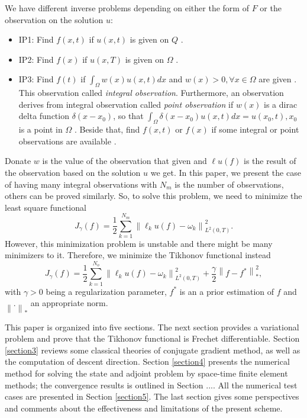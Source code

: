 \documentclass[]{article}
\begin{document}
We have different inverse problems depending on either the form of $F$ or the observation on the solution $u$: 
\begin{itemize}
	\item IP1: Find $f(x, t)$ if $u(x, t)$ is given on $Q$ \cite{a1, a2}.
	\item IP2: Find $f(x)$ if $u(x, T)$ is given on $\Omega$ \cite{a3, a4, a5, a6}.
	\item IP3: Find $f(t)$ if $\int_\Omega w(x)u(x, t)dx$ and $w(x)>0, \forall x\in \Omega$ are given \cite{a7, a8, a9}. This observation called \textit{integral observation}. Furthermore, an observation derives from integral observation called \textit{point observation} if $w(x)$ is a dirac delta function $\delta(x-x_0)$, so that $\int_\Omega\delta(x-x_0)u(x, t)dx=u(x_0, t), x_0$ is a point in $\Omega$ \cite{a10, a11, a12}. Beside that, find $f(x, t)$ or $f(x)$ if some integral or point observations are available \cite{a13}.
\end{itemize}
Donate $w$ is the value of the observation that given and $\ell u(f)$ is the result of the observation based on the solution $u$ we get. In this paper, we present  the case of having many integral observations with $N_m$ is the number of observations, others can be proved similarly. So, to solve this problem, we need to minimize the least square functional \cite{a14, a15}
$$J_{\gamma}(f)=\frac{1}{2}\sum_{k=1}^{N_{m}}\left\|\ell_k u(f)-\omega_k\right\|_{L^2(0, T)}^2.$$
However, this minimization problem is unstable and there might be many minimizers to it. Therefore, we minimize the Tikhonov functional instead
$$J_{\gamma}(f)=\frac{1}{2}\sum_{k=1}^{N_{o}}\left\|\ell_k u(f)-\omega_k\right\|_{L^2(0, T)}^2+\frac{\gamma}{2}\left\|f-f^*\right\|_{*}^2,$$
with $\gamma>0$ being a regularization parameter, $f^*$ is an a prior estimation of $f$ and $\left\|.\right\|_*$ an appropriate norm.

This paper is organized into five sections. The next section provides a variational problem and prove that the Tikhonov functional is Frechet differentiable. Section \ref{section3} reviews some classical theories of conjugate gradient method, as well as the computation of descent direction. Section \ref{section4} presents the numerical method for solving the state and adjoint problem by space-time finite element methods; the convergence results is outlined in Section .... All the numerical test cases are presented in Section \ref{section5}. The last section gives some perspectives and comments about the effectiveness and limitations of the present scheme.
\end{document}
